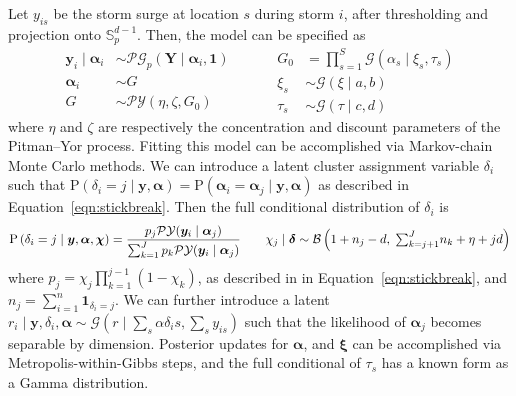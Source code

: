 Let $y_{is}$ be the storm surge at location $s$ during storm $i$, after thresholding and projection 
    onto $\mathbb{S}_p^{d-1}$.  Then, the model can be specified as
    \begin{equation}
        \label{eqn:pypg}
        \begin{aligned}
            \bm{y}_i \mid \bm{\alpha}_i &\sim
                \mathcal{PG}_p\left(\bm{Y}\mid\bm{\alpha}_i,\bm{1}\right)\\
            \bm{\alpha}_i &\sim G\\
            G &\sim \mathcal{PY}\left(\eta, \zeta, G_0\right)        
        \end{aligned}
        ~\hspace{1cm}
        \begin{aligned}
            G_0 &= {\textstyle\prod}_{s = 1}^{S}\mathcal{G}(\alpha_{s}\mid \xi_{s},\tau_{s})\\
            \xi_{s} &\sim \mathcal{G}(\xi\mid a, b)\\
            \tau_{s} &\sim \mathcal{G}(\tau\mid c, d)
        \end{aligned} 
    \end{equation}
    where $\eta$ and $\zeta$ are respectively the concentration and discount parameters
    of the Pitman--Yor process.  Fitting this model can be accomplished via Markov-chain 
    Monte Carlo methods. We can introduce a latent cluster assignment variable $\delta_i$ 
    such that 
    $\text{P}\left(\delta_i = j\mid\bm{y},\bm{\alpha}\right) = 
        \text{P}\left(\bm{\alpha}_i = \bm{\alpha}_j\mid \bm{y},\bm{\alpha}\right)$ as described in 
        Equation~\eqref{eqn:stickbreak}.
    Then the full conditional distribution of $\delta_i$ is
    \begin{equation}
        \label{eqn:pdelta}
        \text{P}\left(\delta_i = j\mid \bm{y},\bm{\alpha},\bm{\chi}\right) = 
            \frac{p_j\mathcal{PY}(\bm{y}_i\mid\bm{\alpha}_j)}{
                \sum_{k = 1}^J p_k\mathcal{PY}(\bm{y}_i\mid\bm{\alpha}_j)}
                \;\hspace{0.5cm}\;
            \chi_j\mid\bm{\delta} \sim \mathcal{B}\left(1 + n_j - d,\; 
                            {\textstyle \sum}_{k = j+1}^J n_k + \eta + jd\right)
    \end{equation}
    where $p_j = \chi_j\prod_{k=1}^{j-1}(1 - \chi_k)$,  as described in in 
    Equation~\eqref{eqn:stickbreak}, and $n_j = \sum_{i = 1}^n\bm{1}_{\delta_i = j}$.
    We can further introduce a latent $r_i\mid \bm{y}, \delta_i,\bm{\alpha} \sim 
        \mathcal{G}\left(r\mid \sum_s \alpha{\delta_is},\sum_s y_{is}\right)$ such that the
    likelihood of $\bm{\alpha}_j$ becomes separable by dimension.  Posterior updates 
    for $\bm{\alpha}$, and $\bm{\xi}$ can be accomplished via Metropolis-within-Gibbs steps,
    and the full conditional of $\tau_s$ has a known form as a Gamma distribution.

